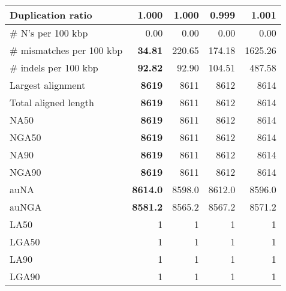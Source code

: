 \documentclass[12pt,a4paper]{article}
\begin{document}
\begin{table}[ht]
\begin{center}
\begin{tabular}{|l*{4}{|r}|}
Duplication ratio & 1.000 & 1.000 & {\bf 0.999} & 1.001 \\ \hline
\# N's per 100 kbp & 0.00 & 0.00 & 0.00 & 0.00 \\ \hline
\# mismatches per 100 kbp & {\bf 34.81} & 220.65 & 174.18 & 1625.26 \\ \hline
\# indels per 100 kbp & {\bf 92.82} & 92.90 & 104.51 & 487.58 \\ \hline
Largest alignment & {\bf 8619} & 8611 & 8612 & 8614 \\ \hline
Total aligned length & {\bf 8619} & 8611 & 8612 & 8614 \\ \hline
NA50 & {\bf 8619} & 8611 & 8612 & 8614 \\ \hline
NGA50 & {\bf 8619} & 8611 & 8612 & 8614 \\ \hline
NA90 & {\bf 8619} & 8611 & 8612 & 8614 \\ \hline
NGA90 & {\bf 8619} & 8611 & 8612 & 8614 \\ \hline
auNA & {\bf 8614.0} & 8598.0 & 8612.0 & 8596.0 \\ \hline
auNGA & {\bf 8581.2} & 8565.2 & 8567.2 & 8571.2 \\ \hline
LA50 & 1 & 1 & 1 & 1 \\ \hline
LGA50 & 1 & 1 & 1 & 1 \\ \hline
LA90 & 1 & 1 & 1 & 1 \\ \hline
LGA90 & 1 & 1 & 1 & 1 \\ \hline
\end{tabular}
\end{center}
\end{table}
\end{document}
